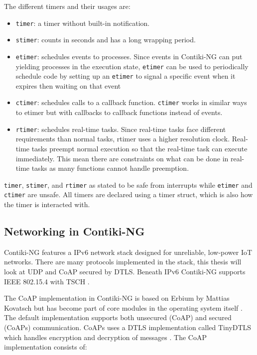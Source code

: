 \documentclass[0-thesis.tex]{subfiles}
\begin{document}
The different timers and their usages are:
\begin{itemize}
    \item \texttt{timer}: a timer without built-in notification.
    \item \texttt{stimer}: counts in seconds and has a long wrapping period.
    \item \texttt{etimer}: schedules events to processes. Since events in Contiki-NG
            can put yielding processes in the execution state, \texttt{etimer} can be
            used to periodically schedule code by setting up an \texttt{etimer} to
            signal a specific event when it expires then waiting on that event
    \item \texttt{ctimer}: schedules calls to a callback function. \texttt{ctimer}
            works in similar ways to etimer but with callbacks to callback functions
            instead of events.
    \item \texttt{rtimer}: schedules real-time tasks. Since real-time tasks face
            different requirements than normal tasks, rtimer uses a higher resolution
            clock. Real-time tasks preempt normal execution so that the real-time task can
            execute immediately. This mean there are constraints on what can be done in
            real-time tasks as many functions cannot handle preemption.
\end{itemize}

\texttt{timer}, \texttt{stimer}, and \texttt{rtimer} as stated to be safe from interrupts
while \texttt{etimer} and \texttt{ctimer} are unsafe. All timers are declared using a timer
struct, which is also how the timer is interacted with.

\subsection{Networking in Contiki-NG}
\label{ssec:networking-contiki}
Contiki-NG features a IPv6 network stack designed for unreliable, low-power IoT networks.
There are many protocols implemented in the stack, this thesis will look at UDP and CoAP
secured by DTLS. Beneath IPv6 Contiki-NG supports IEEE 802.15.4 with TSCH
\parencite{ieee-802.15.4}.

The CoAP implementation in Contiki-NG is based on Erbium by Mattias Kovatsch but has
become part of core modules in the operating system itself \parencite{low-power-coap}. The
default implementation supports both unsecured (CoAP) and secured (CoAPs) communication.
CoAPs uses a DTLS implementation called TinyDTLS which handles encryption and decryption
of messages \parencite{tinydtls-github}. The CoAP implementation consists of:
\end{document}
